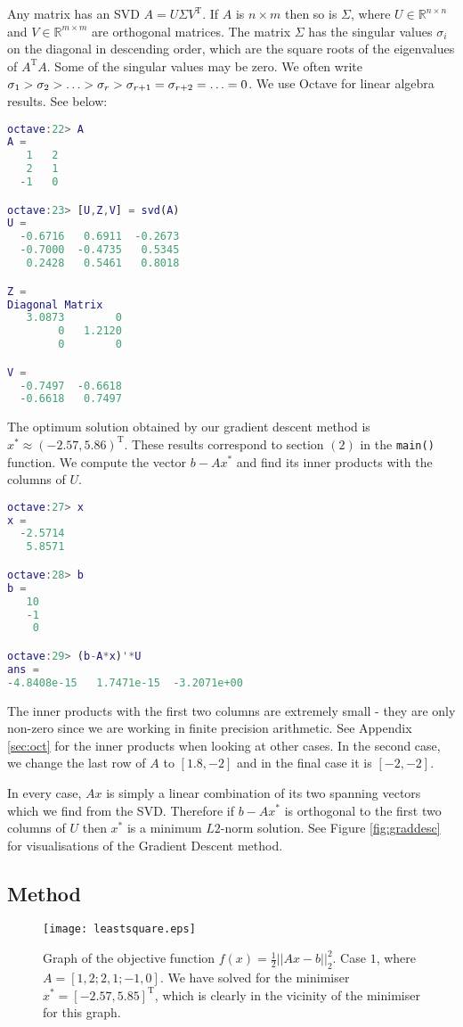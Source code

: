 \documentclass{article}
\begin{document}
Any matrix has an SVD $A = U\Sigma V^\mathrm{T}$.
If $A$ is ${n\times m}$ then so is ${\Sigma}$,
where ${U} \in \mathds{R}^{n \times n}$ and ${V} \in \mathds{R}^{m \times m}$ are orthogonal matrices.
The matrix ${\Sigma}$ has the singular values $\sigma_i$ on the diagonal in descending order,
which are the square roots of the eigenvalues of ${A}^\mathrm{T}{A}$.
Some of the singular values may be zero.
We often write $\sigma_1 > \sigma_2 > \mathellipsis > \sigma_r > \sigma_{r+1} = \sigma_{r+2} = \mathellipsis = 0$.
We use Octave for linear algebra results. See below:

\begin{lstlisting}[language=MATLAB]
octave:22> A
A =
   1   2
   2   1
  -1   0

octave:23> [U,Z,V] = svd(A)
U =
  -0.6716   0.6911  -0.2673
  -0.7000  -0.4735   0.5345
   0.2428   0.5461   0.8018

Z =
Diagonal Matrix
   3.0873        0
        0   1.2120
        0        0

V =
  -0.7497  -0.6618
  -0.6618   0.7497
\end{lstlisting}
The optimum solution obtained by our gradient descent method is  $x^* \approx (  -2.57, 5.86)^\mathrm{T}$.
These results correspond to section $(2)$ in the \texttt{main()} function.
We compute the vector $b-Ax^*$ and find its inner products with the columns of $U$.
\begin{lstlisting}[language=MATLAB]
octave:27> x
x =
  -2.5714
   5.8571

octave:28> b
b =
   10
   -1
    0

octave:29> (b-A*x)'*U
ans =
-4.8408e-15   1.7471e-15  -3.2071e+00
\end{lstlisting}
The inner products with the first two columns are extremely small - they are only non-zero since we are working in finite precision arithmetic.
See Appendix \ref{sec:oct} for the inner products when looking at other cases.
In the second case, we change the last row of $A$ to $[1.8, -2]$  and in the final case it is $[-2, -2]$.

In every case, $Ax$ is simply a linear combination of its two spanning vectors which we find from the SVD.
Therefore if $b-Ax^*$ is orthogonal to the first two columns of $U$ then $x^*$ is a minimum $L2$-norm solution.
See Figure \ref{fig:graddesc} for visualisations of the Gradient Descent method.

\subsection{Method}
\begin{figure}
    \centering
    \texttt{[image: leastsquare.eps]}
    \caption{
        Graph of the objective function $f(x) = \frac{1}{2}||Ax-b||_2^2$.
        Case $1$, where $A = [1, 2;2, 1;-1, 0]$.
        We have solved for the minimiser $x^* = [-2.57, 5.85]^\mathrm{T}$,
        which is clearly in the vicinity of the minimiser for this graph.
    }
    \label{fig:cvx}
\end{figure}
\end{document}
